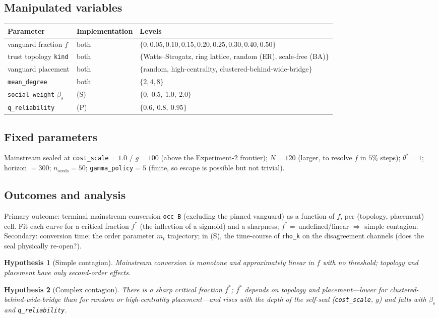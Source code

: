 \documentclass[11pt]{article}
\newcommand{\param}[1]{\texttt{#1}}
\newcommand{\thetastar}{\theta^{\!*}}
\newcommand{\mt}{m_t}
\newtheorem{hyp}{Hypothesis}
\begin{document}
\subsection{Manipulated variables}
\begin{center}
\begin{tabular}{@{}lll@{}}
\toprule
Parameter & Implementation & Levels \\
\midrule
vanguard fraction $f$ & both & $\{0,0.05,0.10,0.15,0.20,0.25,0.30,0.40,0.50\}$ \\
trust topology \param{kind} & both & $\{$Watts--Strogatz, ring lattice, random (ER), scale-free (BA)$\}$ \\
vanguard placement & both & $\{$random, high-centrality, clustered-behind-wide-bridge$\}$ \\
\param{mean\_degree} & both & $\{2,4,8\}$ \\
\param{social\_weight} $\beta_s$ & (S) & $\{0,\ 0.5,\ 1.0,\ 2.0\}$ \\
\param{q\_reliability} & (P) & $\{0.6,\ 0.8,\ 0.95\}$ \\
\bottomrule
\end{tabular}
\end{center}

\subsection{Fixed parameters}
Mainstream sealed at \param{cost\_scale}${=}1.0$ / $g{=}100$ (above the
Experiment-2 frontier); $N{=}120$ (larger, to resolve $f$ in $5\%$ steps);
$\thetastar{=}1$; horizon ${=}300$; $n_{\text{seeds}}{=}50$;
\param{gamma\_policy}${=}5$ (finite, so escape is possible but not trivial).

\subsection{Outcomes and analysis}
Primary outcome: terminal mainstream conversion \param{occ\_B} (excluding the
pinned vanguard) as a function of $f$, per (topology, placement) cell. Fit each
curve for a critical fraction $f^{*}$ (the inflection of a sigmoid) and a sharpness;
$f^{*}{=}\,$undefined/linear $\Rightarrow$ simple contagion. Secondary: conversion
time; the order parameter $\mt$ trajectory; in (S), the time-course of
\param{rho\_k} on the disagreement channels (does the seal physically re-open?).

\begin{hyp}[Simple contagion]\label{h:simple}
Mainstream conversion is monotone and approximately linear in $f$ with no
threshold; topology and placement have only second-order effects.
\end{hyp}
\begin{hyp}[Complex contagion]\label{h:complex}
There is a sharp critical fraction $f^{*}$; $f^{*}$ \emph{depends on topology and
placement}---lower for clustered-behind-wide-bridge than for random or
high-centrality placement---and rises with the depth of the self-seal
(\param{cost\_scale}, $g$) and falls with $\beta_s$ and \param{q\_reliability}.
\end{hyp}
\end{document}
